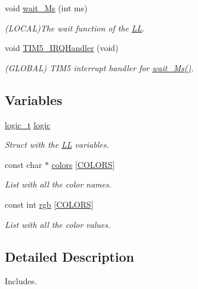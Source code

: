 \begin{DoxyCompactItemize}
void \mbox{\hyperlink{namespace_l_l_ab30bdedb41438098df71bea7d5eb624d}{wait\+\_\+\+Ms}} (int ms)
\begin{DoxyCompactList}\small\item\em (L\+O\+C\+AL)The wait function of the \mbox{\hyperlink{namespace_l_l}{LL}}. \end{DoxyCompactList}\item 
void \mbox{\hyperlink{namespace_l_l_a5e66446caf21dd90191dc07a13ce2378}{T\+I\+M5\+\_\+\+I\+R\+Q\+Handler}} (void)
\begin{DoxyCompactList}\small\item\em (G\+L\+O\+B\+AL) T\+I\+M5 interrupt handler for \mbox{\hyperlink{namespace_l_l_ab30bdedb41438098df71bea7d5eb624d}{wait\+\_\+\+Ms()}}. \end{DoxyCompactList}\end{DoxyCompactItemize}
\subsection*{Variables}
\begin{DoxyCompactItemize}
\item 
\mbox{\hyperlink{struct_l_l_1_1logic__t}{logic\+\_\+t}} \mbox{\hyperlink{namespace_l_l_ac675f1a7fd8efbaf36d511424a5f24ce}{logic}}
\begin{DoxyCompactList}\small\item\em Struct with the \mbox{\hyperlink{namespace_l_l}{LL}} variables. \end{DoxyCompactList}\item 
const char $\ast$ \mbox{\hyperlink{namespace_l_l_a4a2f81c33b1d2c746488022b4ebf7a3a}{colors}} \mbox{[}\mbox{\hyperlink{group___global_ga883046b8f0d1f6368a9b9eaf5ca36af3}{C\+O\+L\+O\+RS}}\mbox{]}
\begin{DoxyCompactList}\small\item\em List with all the color names. \end{DoxyCompactList}\item 
const int \mbox{\hyperlink{namespace_l_l_a49c70cdbac1a1c4df4224875018c75b4}{rgb}} \mbox{[}\mbox{\hyperlink{group___global_ga883046b8f0d1f6368a9b9eaf5ca36af3}{C\+O\+L\+O\+RS}}\mbox{]}
\begin{DoxyCompactList}\small\item\em List with all the color values. \end{DoxyCompactList}\end{DoxyCompactItemize}


\subsection{Detailed Description}
Includes. 

